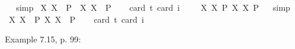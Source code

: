 \begin{isabellebody}
\ %
%
\isamarkupfalse%
\ simp%
%
%
\isanewline
{}\isamarkupfalse%
\ {\isachardoublequoteopen}{\isasymlfloor}{\isacharparenleft}{\isasymlambda}X{\isachardot}\ \isactrlbold {\isasymdiamond}\isactrlbold {\isasymexists}X{\isacharparenright}\ \ {\isacharparenleft}P{\isacharcolon}{\isacharcolon}{\isasymup}{\isasymlangle}{\isasymlangle}{\isasymzero}{\isasymrangle}{\isasymrangle}{\isacharparenright}\ \isactrlbold {\isasymrightarrow}\ {\isacharparenleft}{\isasymlambda}X{\isachardot}\ \isactrlbold {\isasymexists}X{\isacharparenright}\ \ P{\isasymrfloor}{\isachardoublequoteclose}\ \isanewline
\ \ \isamarkupfalse%
{\isacharbrackleft}card\ {\isacharprime}t{\isacharequal}{}{\isacharcomma}\ card\ i{\isacharequal}{}{\isacharbrackright}%
\ %
%
\isamarkupfalse%
\ %
%
%
%
\isanewline
{}\isamarkupfalse%
\ {\isachardoublequoteopen}{\isasymlfloor}{\isacharparenleft}{\isasymlambda}X{\isachardot}\ \isactrlbold {\isasymdiamond}\isactrlbold {\isasymexists}X{\isacharparenright}\ \isactrlbold {\isasymdown}{\isacharparenleft}P{\isacharcolon}{\isacharcolon}{\isasymup}{\isasymlangle}{\isasymup}{\isasymlangle}{\isasymzero}{\isasymrangle}{\isasymrangle}{\isacharparenright}\isactrlbold {\isasymrightarrow}\ {\isacharparenleft}{\isasymlambda}X{\isachardot}\ \isactrlbold {\isasymexists}X{\isacharparenright}\ \isactrlbold {\isasymdown}P{\isasymrfloor}{\isachardoublequoteclose}%
\ %
%
\isamarkupfalse%
\ simp%
%
%
\isanewline
{}\isamarkupfalse%
\ {\isachardoublequoteopen}{\isasymlfloor}{\isacharparenleft}{\isasymlambda}X{\isachardot}\ \isactrlbold {\isasymdiamond}\isactrlbold {\isasymexists}X{\isacharparenright}\ \ {\isacharparenleft}P{\isacharcolon}{\isacharcolon}{\isasymup}{\isasymlangle}{\isasymup}{\isasymlangle}{\isasymzero}{\isasymrangle}{\isasymrangle}{\isacharparenright}\isactrlbold {\isasymrightarrow}\ {\isacharparenleft}{\isasymlambda}X{\isachardot}\ \isactrlbold {\isasymexists}X{\isacharparenright}\ \ P{\isasymrfloor}{\isachardoublequoteclose}\ \isanewline
\ \ \isamarkupfalse%
{\isacharbrackleft}card\ {\isacharprime}t{\isacharequal}{}{\isacharcomma}\ card\ i{\isacharequal}{}{\isacharbrackright}%
\ %
%
\isamarkupfalse%
\ %
%
%
%
%
\begin{isamarkuptext}%
Example 7.15, p. 99:%
\end{isamarkuptext}\isamarkuptrue%
\isamarkupfalse%

\end{isabellebody}
